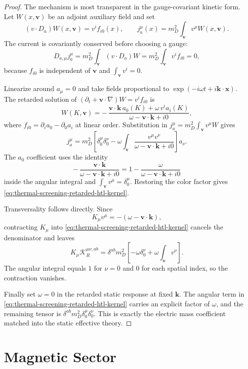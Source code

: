 \begin{proof}
The mechanism is most transparent in the gauge-covariant kinetic form.  Let
\(W(x,\mathbf v)\) be an adjoint auxiliary field and set
\[
  (v\cdot D_a)W(x,\mathbf v)=v^if_{i0}(x),\qquad
  j_a^\mu(x)=m_D^2\int_{\mathbf v}v^\mu W(x,\mathbf v).
\]
The current is covariantly conserved before choosing a gauge:
\[
  D_{a,\mu} j_a^\mu
  =
  m_D^2\int_{\mathbf v}(v\cdot D_a)W
  =
  m_D^2\int_{\mathbf v}v^if_{i0}
  =
  0,
\]
because \(f_{i0}\) is independent of \(\mathbf v\) and
\(\int_{\mathbf v}v^i=0\).

Linearize around \(a_\mu=0\) and take fields proportional to
\(\exp(-i\omega t+i\mathbf k\cdot\mathbf x)\).  The retarded solution of
\((\partial_t+\mathbf v\cdot\nabla)W=v^if_{i0}\) is
\[
  W(K,\mathbf v)
  =
  -\,\frac{\mathbf v\cdot\mathbf k\,a_0(K)
  +\omega\,v^ia_i(K)}
  {\omega-\mathbf v\cdot\mathbf k+i0},
\]
where \(f_{i0}=\partial_ia_0-\partial_0a_i\) at linear order.
Substitution in \(j_a^\mu=m_D^2\int_{\mathbf v}v^\mu W\) gives
\[
  j_a^\mu
  =
  m_D^2\left[
    \delta^\mu_0\delta^\nu_0
    -
    \omega\int_{\mathbf v}
    \frac{v^\mu v^\nu}
    {\omega-\mathbf v\cdot\mathbf k+i0}
  \right]a_\nu .
\]
The \(a_0\) coefficient uses the identity
\[
  -\,\frac{\mathbf v\cdot\mathbf k}
  {\omega-\mathbf v\cdot\mathbf k+i0}
  =
  1-\frac{\omega}{\omega-\mathbf v\cdot\mathbf k+i0}
\]
inside the angular integral and
\(\int_{\mathbf v}v^\mu=\delta^\mu_0\).  Restoring the color factor gives
\eqref{eq:thermal-screening-retarded-htl-kernel}.

Transversality follows directly.  Since
\[
  K_\mu v^\mu=-(\omega-\mathbf v\cdot\mathbf k),
\]
contracting \(K_\mu\) into
\eqref{eq:thermal-screening-retarded-htl-kernel} cancels the denominator and
leaves
\[
  K_\mu\mathcal K_R^{\mu\nu,ab}
  =
  \delta^{ab}m_D^2
  \left[
    -\omega\delta^\nu_0
    +\omega\int_{\mathbf v}v^\nu
  \right].
\]
The angular integral equals \(1\) for \(\nu=0\) and \(0\) for each spatial
index, so the contraction vanishes.

Finally set \(\omega=0\) in the retarded static response at fixed
\(\mathbf k\).  The angular term in
\eqref{eq:thermal-screening-retarded-htl-kernel} carries an explicit factor
of \(\omega\), and the remaining tensor is
\(\delta^{ab}m_D^2\delta^\mu_0\delta^\nu_0\).  This is exactly the electric
mass coefficient matched into the static effective theory.
\end{proof}

\section{Magnetic Sector}

